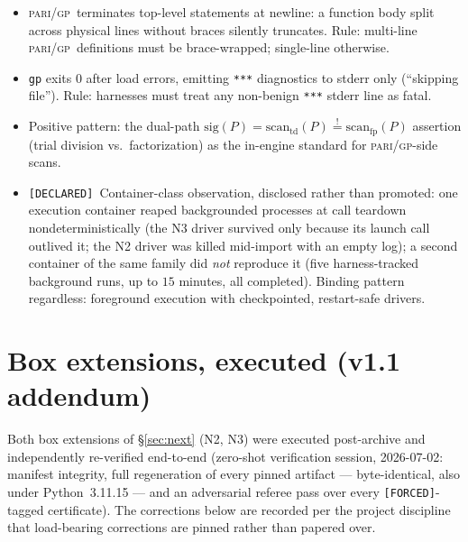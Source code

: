 \documentclass[11pt]{article}
\newcommand{\F}{\textnormal{\texttt{[FORCED]}}}
\newcommand{\Dc}{\textnormal{\texttt{[DECLARED]}}}
\newcommand{\gp}{\textsc{pari/gp}}
\theoremstyle{definition}
\begin{document}
\begin{itemize}
\item[\textbf{H1.}] \gp\ terminates top-level statements at newline: a function
body split across physical lines without braces silently truncates. Rule:
multi-line \gp\ definitions must be brace-wrapped; single-line otherwise.
\item[\textbf{H2.}] \texttt{gp} exits $0$ after load errors, emitting
\texttt{***} diagnostics to stderr only (``skipping file''). Rule: harnesses
must treat any non-benign \texttt{***} stderr line as fatal.
\item[\textbf{H3.}] Positive pattern: the dual-path
$\mathrm{sig}(P)=\mathrm{scan}_{\mathrm{td}}(P)\overset{!}{=}\mathrm{scan}_{\mathrm{fp}}(P)$
assertion (trial division vs.\ factorization) as the in-engine standard for
\gp-side scans.
\item[\textbf{H4.}] \Dc\ Container-class observation, disclosed rather than
promoted: one execution container reaped backgrounded processes at call
teardown nondeterministically (the N3 driver survived only because its launch
call outlived it; the N2 driver was killed mid-import with an empty log); a
second container of the same family did \emph{not} reproduce it (five
harness-tracked background runs, up to $15$ minutes, all completed). Binding
pattern regardless: foreground execution with checkpointed, restart-safe
drivers.
\end{itemize}

\section{Box extensions, executed (v1.1 addendum)}\label{sec:boxext}

Both box extensions of \S\ref{sec:next} (N2, N3) were executed post-archive
and independently re-verified end-to-end (zero-shot verification session,
2026-07-02: manifest integrity, full regeneration of every pinned artifact ---
byte-identical, also under Python~3.11.15 --- and an adversarial referee pass
over every \F-tagged certificate). The corrections below are recorded per the
project discipline that load-bearing corrections are pinned rather than
papered over.
\end{document}

